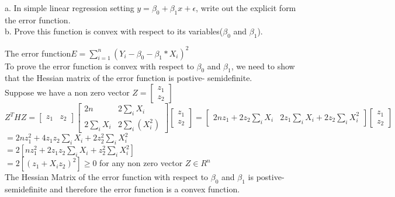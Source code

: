 \documentclass[12pt]{article}
\begin{document}
 {
 a. In simple linear regression setting $y=\beta_0+\beta_1x+\epsilon$, write out the explicit form the error function.\\
 b. Prove this function is convex with respect to its variables($\beta_0$ and $\beta_1$). }
 { \vfill
  \answer
} {
The error function$ E=\sum_{i=1}^n(Y_i-\beta_0-\beta_1*X_i)^2$\\
To prove the error function is convex with respect to $\beta_0$ and $\beta_1$, we need to show that the Hessian matrix of the error function is postive- semidefinite.\\
Suppose we have a non zero vector $Z=\begin{bmatrix}z_1\\
z_2\end{bmatrix}$\\
$Z^THZ=\begin{bmatrix}z_1&z_2\end{bmatrix}\begin{bmatrix}2n& 2\sum_i X_i\\
2\sum_i X_i & 2\sum_i(X_i^2) \end{bmatrix}\begin{bmatrix}z_1\\
z_2\end{bmatrix}=\begin{bmatrix}2nz_1+2z_2\sum_iX_i & 2z_1\sum_iX_i+2z_2\sum_iX_i^2\end{bmatrix}\begin{bmatrix}z_1\\
z_2\end{bmatrix}$\\
$=2nz_1^2+4z_1z_2\sum_iX_i+2z_2^2\sum_iX_i^2$\\
$=2[nz_1^2+2z_1z_2\sum_iX_i+z_2^2\sum_iX_i^2]$\\
$=2[(z_1+X_iz_2)^2]\geq0$ for any non zero vector $Z\in R^n$\\
The Hessian Matrix of the error function with respect to $\beta_0$ and $\beta_1$ is postive-semidefinite and therefore the error function is a convex function.

}




\problemsdone
\end{document}
